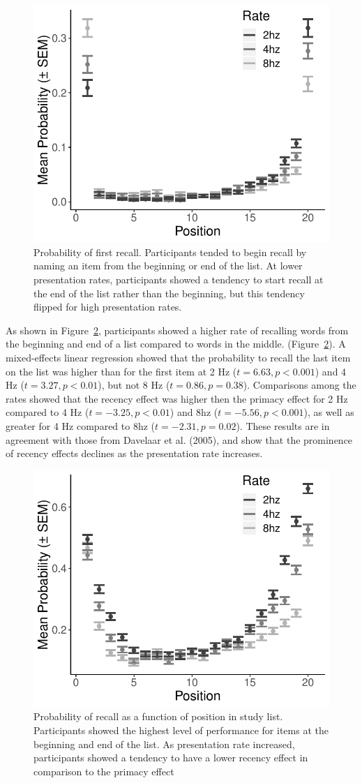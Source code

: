 \documentclass[10pt,letterpaper]{article}
\begin{document}
\begin{figure}[H]
\begin{center}
\includegraphics[width = .4\textwidth]{PFR_adjusted.pdf}
\end{center}
\caption{Probability of first recall. Participants tended to begin recall by naming an item from the beginning or end of the list. At lower presentation rates, participants showed a tendency to start recall at the end of the list rather than the beginning, but this tendency flipped for high presentation rates.} 
\label{PFR}
\end{figure}

As shown in Figure~\ref{SPC}, participants showed a higher rate of recalling words from the beginning and end of a list compared to words in the middle. (Figure~\ref{SPC}). A mixed-effects linear regression showed that the probability to recall the last item on the list was higher than for the first item at 2 Hz ($t = 6.63, p < 0.001$) and 4 Hz ($t = 3.27, p < 0.01$), but not 8 Hz ($t = 0.86, p = 0.38$). Comparisons among the rates showed that the recency effect was higher then the primacy effect for 2 Hz compared to 4 Hz ($t = -3.25, p < 0.01$) and 8hz ($t = -5.56, p < 0.001$), as well as greater for 4 Hz compared to 8hz ($t = -2.31, p = 0.02$). 
These results are in agreement with those from Davelaar et al. (2005), and show that the prominence of recency effects declines as the presentation rate increases. 
\nocite{DaveEtal05}

\begin{figure}[H]
\begin{center}
\includegraphics[width = .4\textwidth]{SPC_adjusted.pdf}
\end{center}
\caption{Probability of recall as a function of position in study list. Participants showed the highest level of performance for items at the beginning and end of the list. As presentation rate increased, participants showed a tendency to have a lower recency effect in comparison to the primacy effect} 
\label{SPC}
\end{figure}
\end{document}
